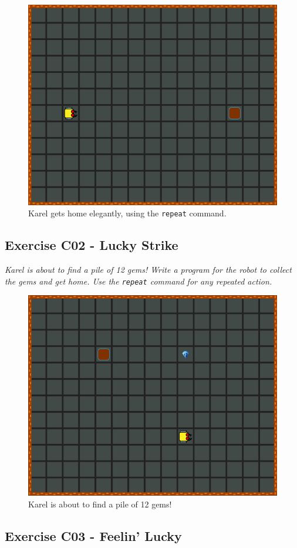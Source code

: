 \documentclass[article,A4,12pt]{llncs}
\begin{document}
{{{\begin{figure}[!ht]
\begin{center}
\includegraphics[height=0.4\textwidth]{img/c01.png}
\end{center}
\vspace{-4mm}
\caption{Karel gets home elegantly, using the {\tt repeat} command.}
\label{fig:c01}
\vspace{-4mm}
\end{figure}
\noindent


\subsection{Exercise C02 - Lucky Strike}

{\em Karel is about to find a pile of 12 gems! Write a program for the robot to collect the gems and get home. Use the {\tt repeat} command for any repeated action. 

\begin{figure}[!ht]
\begin{center}
\includegraphics[height=0.4\textwidth]{img/c02.png}
\end{center}
\vspace{-4mm}
\caption{Karel is about to find a pile of 12 gems!}
\label{fig:c02}
\vspace{-4mm}
\end{figure}
\noindent

\newpage

\subsection{Exercise C03 - Feelin' Lucky}

}}}}
\end{document}
